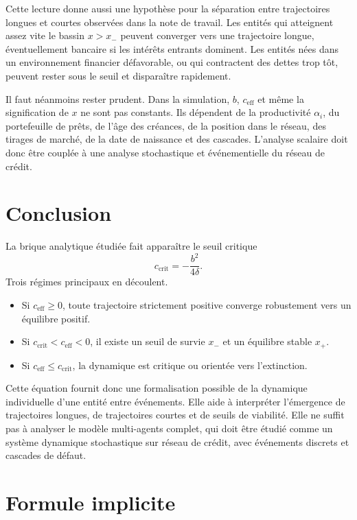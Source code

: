 \documentclass[11pt,a4paper]{article}
\begin{document}
Cette lecture donne aussi une hypothèse pour la séparation entre trajectoires longues et courtes observées dans la note de travail. Les entités qui atteignent assez vite le bassin \(x>x_-\) peuvent converger vers une trajectoire longue, éventuellement bancaire si les intérêts entrants dominent. Les entités nées dans un environnement financier défavorable, ou qui contractent des dettes trop tôt, peuvent rester sous le seuil et disparaître rapidement.

Il faut néanmoins rester prudent. Dans la simulation, \(b\), \(c_{\mathrm{eff}}\) et même la signification de \(x\) ne sont pas constants. Ils dépendent de la productivité \(\alpha_i\), du portefeuille de prêts, de l'âge des créances, de la position dans le réseau, des tirages de marché, de la date de naissance et des cascades. L'analyse scalaire doit donc être couplée à une analyse stochastique et événementielle du réseau de crédit.

\section{Conclusion}

La brique analytique étudiée fait apparaître le seuil critique
\[
    c_{\mathrm{crit}}=-\frac{b^2}{4\delta}.
\]
Trois régimes principaux en découlent.
\begin{itemize}
    \item Si \(c_{\mathrm{eff}}\geq 0\), toute trajectoire strictement positive converge robustement vers un équilibre positif.
    \item Si \(c_{\mathrm{crit}}<c_{\mathrm{eff}}<0\), il existe un seuil de survie \(x_-\) et un équilibre stable \(x_+\).
    \item Si \(c_{\mathrm{eff}}\leq c_{\mathrm{crit}}\), la dynamique est critique ou orientée vers l'extinction.
\end{itemize}
Cette équation fournit donc une formalisation possible de la dynamique individuelle d'une entité entre événements. Elle aide à interpréter l'émergence de trajectoires longues, de trajectoires courtes et de seuils de viabilité. Elle ne suffit pas à analyser le modèle multi-agents complet, qui doit être étudié comme un système dynamique stochastique sur réseau de crédit, avec événements discrets et cascades de défaut.

\appendix

\section{Formule implicite}
\end{document}
